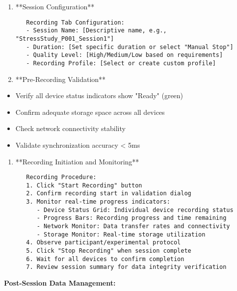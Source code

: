 \documentclass[12pt,a4paper]{article}
\begin{document}
\begin{enumerate}
\item **Session Configuration**
\begin{verbatim}
   Recording Tab Configuration:
   - Session Name: [Descriptive name, e.g., "StressStudy_P001_Session1"]
   - Duration: [Set specific duration or select "Manual Stop"]
   - Quality Level: [High/Medium/Low based on requirements]
   - Recording Profile: [Select or create custom profile]
\end{verbatim}

\item **Pre-Recording Validation**
\end{enumerate}
\begin{itemize}
\item Verify all device status indicators show "Ready" (green)
\item Confirm adequate storage space across all devices
\item Check network connectivity stability
\item Validate synchronization accuracy < 5ms

\end{itemize}
\begin{enumerate}
\item **Recording Initiation and Monitoring**
\begin{verbatim}
   Recording Procedure:
   1. Click "Start Recording" button
   2. Confirm recording start in validation dialog
   3. Monitor real-time progress indicators:
      - Device Status Grid: Individual device recording status
      - Progress Bars: Recording progress and time remaining
      - Network Monitor: Data transfer rates and connectivity
      - Storage Monitor: Real-time storage utilization
   4. Observe participant/experimental protocol
   5. Click "Stop Recording" when session complete
   6. Wait for all devices to confirm completion
   7. Review session summary for data integrity verification
\end{verbatim}

\end{enumerate}
\textbf{Post-Session Data Management:}
\end{document}
